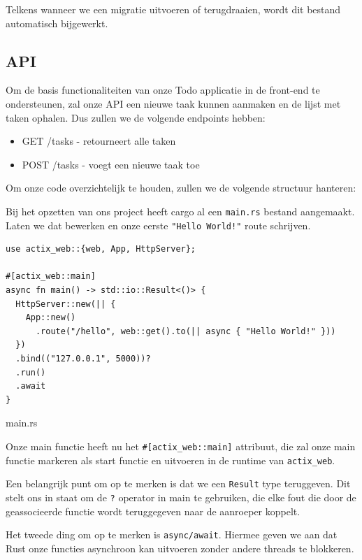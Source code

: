 Telkens wanneer we een migratie uitvoeren of terugdraaien, wordt dit bestand automatisch bijgewerkt.

\clearpage

\subsection{API}

Om de basis functionaliteiten van onze Todo applicatie in de front-end te ondersteunen, zal onze API
een nieuwe taak kunnen aanmaken en de lijst met taken ophalen. Dus zullen we de volgende endpoints
hebben:
\begin{itemize}
  \item GET /tasks - retourneert alle taken
  \item POST /tasks - voegt een nieuwe taak toe
\end{itemize}


Om onze code overzichtelijk te houden, zullen we de volgende structuur hanteren:

Bij het opzetten van ons project heeft cargo al een \texttt{main.rs} bestand aangemaakt.
Laten we dat bewerken en onze eerste \texttt{"Hello World!"} route schrijven.

\begin{listing}[h]
\begin{verbatim}
use actix_web::{web, App, HttpServer};

#[actix_web::main]
async fn main() -> std::io::Result<()> {
  HttpServer::new(|| {
    App::new()
      .route("/hello", web::get().to(|| async { "Hello World!" }))
  })
  .bind(("127.0.0.1", 5000))?
  .run()
  .await
}
\end{verbatim}
\caption{main.rs}
\end{listing}
\clearpage

Onze main functie heeft nu het \texttt{#[actix_web::main]} attribuut, die zal onze main
functie markeren als start functie en uitvoeren in de runtime van \texttt{actix_web}.

Een belangrijk punt om op te merken is dat we een \texttt{Result} type teruggeven. Dit
stelt ons in staat om de \texttt{?} operator in main te gebruiken, die elke fout die door
de geassocieerde functie wordt teruggegeven naar de aanroeper koppelt.

Het tweede ding om op te merken is \texttt{async/await}. Hiermee geven we aan dat Rust
onze functies asynchroon kan uitvoeren zonder andere threads te blokkeren.


